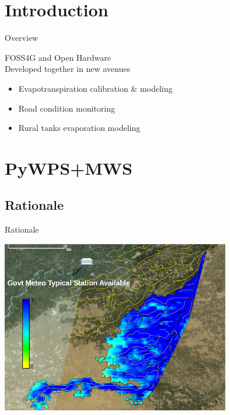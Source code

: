 \documentclass[xcolor=dvipsnames,beamer]{beamer} %
\begin{document}
\section{Introduction}
\begin{frame}[fragile]{Overview}

FOSS4G and Open Hardware\\
Developed together in new avenues
\newline\linebreak

\begin{itemize}
 \item Evapotranspiration calibration \& modeling
 \item Road condition monitoring
 \item Rural tanks evaporation modeling
\end{itemize}
\end{frame}

\section{PyWPS+MWS}
\subsection{Rationale}
\begin{frame}[fragile]{Rationale}

\begin{center}
  \includegraphics[width=10cm]{MWS_v1_deltaT_rationale_0}
\end{center}

\end{frame}
\end{document}
